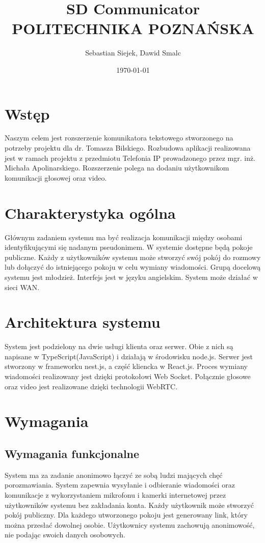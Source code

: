 \documentclass{article}
\title{\textbf{SD Communicator} \\ POLITECHNIKA POZNAŃSKA}
\author{Sebastian Siejek, Dawid Smalc}
\date{\today}
\begin{document}
\justify

\maketitle

\tableofcontents{}

\section{Wstęp}
Naszym celem jest rozszerzenie komunikatora tekstowego stworzonego na potrzeby projektu dla dr. Tomasza Bilskiego. Rozbudowa aplikacji realizowana jest w ramach projektu z przedmiotu Telefonia IP prowadzonego przez mgr. inż. Michała Apolinarskiego. Rozszerzenie polega na dodaniu użytkownikom komunikacji głosowej oraz video.

\section{Charakterystyka ogólna}
Głównym zadaniem systemu ma być realizacja komunikacji między osobami identyfikującymi się nadanym pseudonimem. W systemie dostępne będą pokoje publiczne. Każdy z użytkowników systemu może stworzyć swój pokój do rozmowy lub dołączyć do istniejącego pokoju w celu wymiany wiadomości. Grupą docelową systemu jest młodzież. Interfejs jest w języku angielskim. System może działać w sieci WAN.

\section{Architektura systemu}
System jest podzielony na dwie usługi klienta oraz serwer. Obie z nich są napisane w TypeScript(JavaScript) i działają w środowisku node.js. Serwer jest stworzony w frameworku nest.js, a część kliencka w React.js. Proces wymiany wiadomości realizowany jest dzięki protokołowi Web Socket. Połącznie głosowe oraz video jest realizowane dzięki technologii WebRTC.

\section{Wymagania}
\subsection{Wymagania funkcjonalne}
System ma za zadanie anonimowo łączyć ze sobą ludzi mających chęć porozmawiania. System zapewnia wysyłanie i odbieranie wiadomości oraz komunikacje z wykorzystaniem mikrofonu i kamerki internetowej przez użytkowników systemu bez zakładania konta. Każdy użytkownik może stworzyć pokój publiczny. Dla każdego utworzonego pokoju jest generowany link, który można przesłać dowolnej osobie. Użytkownicy systemu zachowują anonimowość, nie podając swoich danych osobowych.
\end{document}
